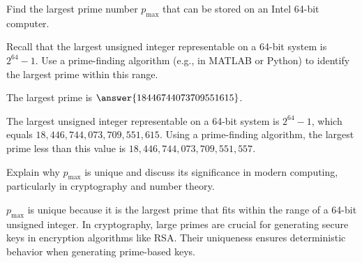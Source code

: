 \documentclass{ximera}
\author{Jont Allen}
\begin{document}
\begin{problem}
    Find the largest prime number $p_{\text{max}}$ that can be stored on an Intel 64-bit computer. 
    \end{problem}
    
    \begin{problem}
    Recall that the largest unsigned integer representable on a 64-bit system is $2^{64} - 1$. 
    Use a prime-finding algorithm (e.g., in MATLAB or Python) to identify the largest prime within this range.

    The largest prime is $\answer{18446744073709551615}$.
    \begin{feedback}[correct]
        The largest unsigned integer representable on a 64-bit system is $2^{64} - 1$, which equals $18,446,744,073,709,551,615$. 
Using a prime-finding algorithm, the largest prime less than this value is $18,446,744,073,709,551,557$.
    \end{feedback}
    \end{problem}
    
    \begin{problem}
    Explain why $p_{\text{max}}$ is unique and discuss its significance in modern computing, 
    particularly in cryptography and number theory.
    \begin{multipleChoice}
    \end{multipleChoice}
    \begin{feedback}[correct]
$p_{\text{max}}$ is unique because it is the largest prime that fits within the range of a 64-bit unsigned integer. 
In cryptography, large primes are crucial for generating secure keys in encryption algorithms like RSA. 
Their uniqueness ensures deterministic behavior when generating prime-based keys.
\end{feedback}


    \end{problem}
\end{document}
